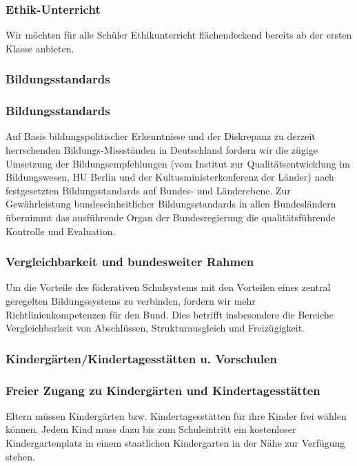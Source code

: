 
\subsubsection{Ethik-Unterricht}
\abstimmung
Wir möchten für alle Schüler Ethikunterricht flächendeckend bereits ab der ersten Klasse anbieten.
 
\newpage
\subsubsection{Bildungsstandards}

\subsubsection{Bildungsstandards}
\abstimmung
Auf Basis bildungspolitischer Erkenntnisse und der Diskrepanz zu derzeit herrschenden Bildungs-Missständen in Deutschland fordern wir die zügige Umsetzung der Bildungsempfehlungen (vom Institut zur Qualitätsentwicklung im Bildungswesen, HU Berlin und der Kultusministerkonferenz der Länder) nach festgesetzten Bildungsstandards auf Bundes- und Länderebene. Zur Gewährleistung bundeseinheitlicher Bildungsstandards in allen Bundesländern übernimmt das ausführende Organ der Bundesregierung die qualitätsführende Kontrolle und Evaluation.

\subsubsection{Vergleichbarkeit und bundesweiter Rahmen}
\abstimmung
Um die Vorteile des föderativen Schulsystems mit den Vorteilen eines zentral geregelten Bildungssystems zu verbinden, fordern wir mehr Richtlinienkompetenzen für den Bund. Dies betrifft insbesondere die Bereiche Vergleichbarkeit von Abschlüssen, Strukturausgleich und Freizügigkeit.
 
\subsubsection{Kindergärten/Kindertagesstätten u. Vorschulen}

\subsubsection{Freier Zugang zu Kindergärten und Kindertagesstätten}
\abstimmung
Eltern müssen Kindergärten bzw. Kindertagesstätten für ihre Kinder frei wählen können. Jedem Kind muss dazu bis zum Schuleintritt ein kostenloser Kindergartenplatz in einem staatlichen Kindergarten in der Nähe zur Verfügung stehen.

